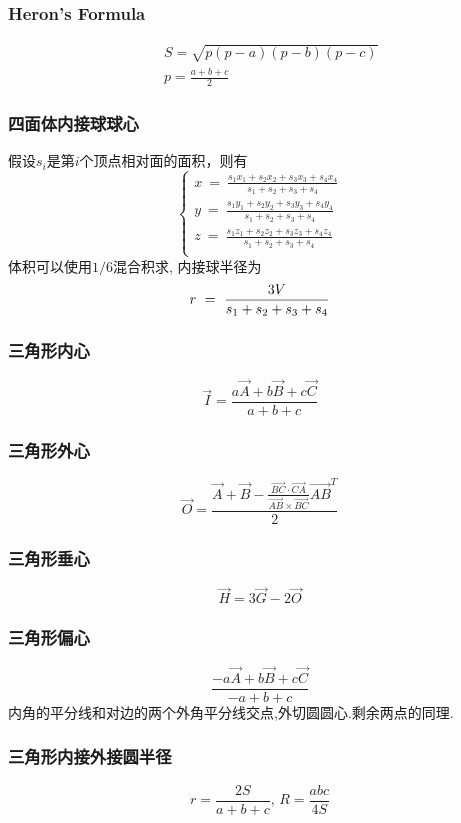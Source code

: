 \begin{small}
\begin{spacing}{0.5}
\begin{multicols*}{2}
	\subsubsection{Heron's Formula}
	\begin{eqnarray*}
		&& S=\sqrt{p(p-a)(p-b)(p-c)} \\
		&& p=\frac{a+b+c}{2}
	\end{eqnarray*}
\subsubsection{四面体内接球球心}
假设$s_i$是第$i$个顶点相对面的面积，则有
\[\left\{
\begin{aligned}
x \ = \ \frac{s_1x_1+s_2x_2+s_3x_3+s_4x_4}{s_1+s_2+s_3+s_4}\\
y \ = \ \frac{s_1y_1+s_2y_2+s_3y_3+s_4y_4}{s_1+s_2+s_3+s_4}\\
z \ = \ \frac{s_1z_1+s_2z_2+s_3z_3+s_4z_4}{s_1+s_2+s_3+s_4}\\
\end{aligned}\right.\]
体积可以使用$1/6$混合积求, 内接球半径为
\[
r \ = \ \frac{3V}{s_1+s_2+s_3+s_4} \\
\]
\subsubsection{三角形内心}
	\[ \vec{I} = \frac{a\vec {A} + b\vec{B} + c\vec{C}}{a + b + c} \]
\subsubsection{三角形外心}
	\[ \vec{O} = \frac{\vec{A} + \vec{B} - \frac{\overrightarrow {BC} \cdot \overrightarrow{CA}}{\overrightarrow {AB} \times \overrightarrow{BC}}\overrightarrow {AB}^T}{2} \]
\subsubsection{三角形垂心}
	\[ \vec{H} = 3\vec{G} - 2\vec{O} \]
\subsubsection{三角形偏心}
	\[ \frac{-a\vec {A} + b\vec{B} + c\vec{C}}{-a + b + c} \]
	内角的平分线和对边的两个外角平分线交点,外切圆圆心.剩余两点的同理. 
\subsubsection{三角形内接外接圆半径}
	\[ r=\frac{2S}{a+b+c},\, R=\frac{abc}{4S} \]
\end{multicols*}

\end{spacing}
\end{small}
